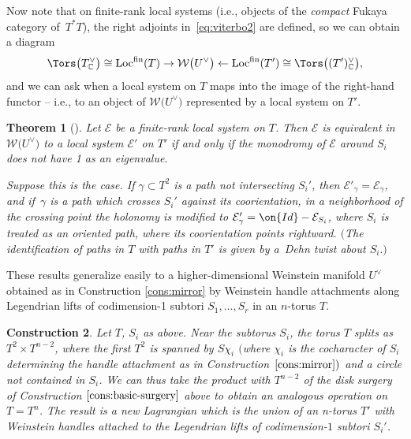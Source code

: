 \documentclass[pdftex]{sigma}%
\numberwithin{equation}{section}
\newtheorem{Theorem}{Theorem}[section]
\newtheorem{Construction}[Theorem]{Construction}
\def\CC{\mathbb{C}}
\def\cW{\mathcal{W}}
\def\cE{\mathcal{E}}
\newcommand\Loc{\textup{Loc}}
\begin{document}
Now note that on finite-rank local systems (i.e., objects of the {\em compact} Fukaya category of~$T^*T$), the right adjoints in~\eqref{eq:viterbo2} are defined, so we can obtain a diagram
\begin{equation}
 \Tors\big(T^\vee_\CC\big)\cong\Loc^{\rm fin}(T)\to \cW\big(U^\vee\big)\gets\Loc^{\rm fin}(T')\cong \Tors\big( (T')^\vee_\CC\big),
\label{eq:viterbo-adj}
\end{equation}
and we can ask when a local system on $T$ maps into the image of the right-hand functor -- i.e., to an object of $\cW\big(U^\vee\big)$ represented by a local system on $T'$.

\begin{Theorem}[{\cite[Theorem 4.16]{STW}}]\label{thm:stw-birational}
 Let $\cE$ be a finite-rank local system on $T$. Then $\cE$ is equivalent in $\cW\big(U^\vee\big)$ to a local system $\cE'$ on $T'$ if and only if the monodromy of $\cE$ around $S_i$ does not have 1 as an eigenvalue.

 Suppose this is the case. If $\gamma\subset T^2$ is a path not intersecting $S_i'$, then $\cE'_\gamma=\cE_\gamma$, and if~$\gamma$ is a path which crosses $S_i'$ against its coorientation, in a neighborhood of the crossing point the holonomy is modified to $\cE'_\gamma = \on{Id}-\cE_{S_i}$, where $S_i$ is treated as an oriented path, where its coorientation points rightward. $($The identification of paths in $T$ with paths in $T'$ is given by a~Dehn twist about $S_i.)$
\end{Theorem}

These results generalize easily to a higher-dimensional Weinstein manifold $U^\vee$ obtained as in Construction \ref{cons:mirror} by Weinstein handle attachments along Legendrian lifts of codimension-1 subtori $S_1,\dots,S_r$ in an $n$-torus $T$.

\begin{Construction}\label{cons:basic-surgery-highd}
 Let $T$, $S_i$ as above. Near the subtorus $S_i$, the torus $T$ splits as $T^2\times T^{n-2}$, where the first $T^2$ is spanned by $S{\chi_i}$ $($where $\chi_i$ is the cocharacter of $S_i$ determining the handle attachment as in Construction~$\ref{cons:mirror})$ and a circle not contained in $S_i$.
We can thus take the product with $T^{n-2}$ of the disk surgery of Construction $\ref{cons:basic-surgery}$ above to obtain an analogous operation on $T=T^n$. The result is a new Lagrangian which is the union of an n-torus $T'$ with Weinstein handles attached to the Legendrian lifts of codimension-$1$ subtori $S_i'$.
\end{Construction}
\end{document}
